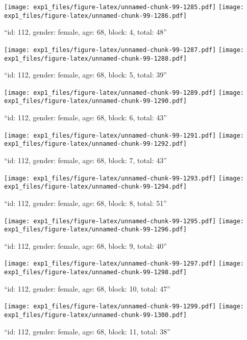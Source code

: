 \documentclass[,]{article}
\begin{document}
\texttt{[image: exp1\_files/figure-latex/unnamed-chunk-99-1285.pdf]}
\texttt{[image: exp1\_files/figure-latex/unnamed-chunk-99-1286.pdf]}

\newpage
[1] 

``id: 112, gender: female, age: 68, block: 4, total: 48''

\texttt{[image: exp1\_files/figure-latex/unnamed-chunk-99-1287.pdf]}
\texttt{[image: exp1\_files/figure-latex/unnamed-chunk-99-1288.pdf]}

\newpage
[1] 

``id: 112, gender: female, age: 68, block: 5, total: 39''

\texttt{[image: exp1\_files/figure-latex/unnamed-chunk-99-1289.pdf]}
\texttt{[image: exp1\_files/figure-latex/unnamed-chunk-99-1290.pdf]}

\newpage
[1] 

``id: 112, gender: female, age: 68, block: 6, total: 43''

\texttt{[image: exp1\_files/figure-latex/unnamed-chunk-99-1291.pdf]}
\texttt{[image: exp1\_files/figure-latex/unnamed-chunk-99-1292.pdf]}

\newpage
[1] 

``id: 112, gender: female, age: 68, block: 7, total: 43''

\texttt{[image: exp1\_files/figure-latex/unnamed-chunk-99-1293.pdf]}
\texttt{[image: exp1\_files/figure-latex/unnamed-chunk-99-1294.pdf]}

\newpage
[1] 

``id: 112, gender: female, age: 68, block: 8, total: 51''

\texttt{[image: exp1\_files/figure-latex/unnamed-chunk-99-1295.pdf]}
\texttt{[image: exp1\_files/figure-latex/unnamed-chunk-99-1296.pdf]}

\newpage
[1] 

``id: 112, gender: female, age: 68, block: 9, total: 40''

\texttt{[image: exp1\_files/figure-latex/unnamed-chunk-99-1297.pdf]}
\texttt{[image: exp1\_files/figure-latex/unnamed-chunk-99-1298.pdf]}

\newpage
[1] 

``id: 112, gender: female, age: 68, block: 10, total: 47''

\texttt{[image: exp1\_files/figure-latex/unnamed-chunk-99-1299.pdf]}
\texttt{[image: exp1\_files/figure-latex/unnamed-chunk-99-1300.pdf]}

\newpage
[1] 

``id: 112, gender: female, age: 68, block: 11, total: 38''
\end{document}
